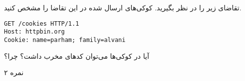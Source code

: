 \documentclass[../main.tex]{subfiles}
\begin{document}

تقاضای زیر را در نظر بگیرید. کوکی‌های ارسال شده در این تقاضا را مشخص کنید.

\begin{latin}
\begin{verbatim}
GET /cookies HTTP/1.1
Host: httpbin.org
Cookie: name=parham; family=alvani
\end{verbatim}
\end{latin}

آیا در کوکی‌ها می‌توان کدهای مخرب داشت؟ چرا؟

۲ نمره
\end{document}
